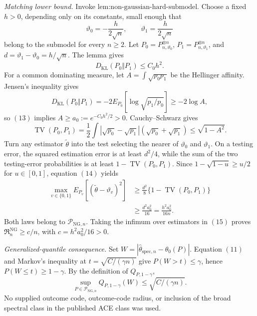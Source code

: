 \emph{Matching lower bound.}
Invoke \(\text{lem:non-gaussian-hard-submodel}\).  Choose a fixed \(h>0\), depending only on its constants, small enough that
\[
 \vartheta_0=-\frac{h}{2\sqrt n},
 \qquad
 \vartheta_1=\frac{h}{2\sqrt n}
\]
belong to the submodel for every \(n\ge2\).  Let \(P_0=P_{n,\vartheta_0}^{\otimes n}\), \(P_1=P_{n,\vartheta_1}^{\otimes n}\), and \(d=\vartheta_1-\vartheta_0=h/\sqrt n\).  The lemma gives
\[
 D_{\mathrm{KL}}(P_0\Vert P_1)\le C_0h^2. \tag{13}
\]
For a common dominating measure, let \(A=\int\sqrt{p_0p_1}\) be the Hellinger affinity.  Jensen's inequality gives
\[
 D_{\mathrm{KL}}(P_0\Vert P_1)
 =-2E_{P_0}\!\left[\log\sqrt{p_1/p_0}\right]
 \ge-2\log A,
\]
so \((13)\) implies \(A\ge a_0:=e^{-C_0h^2/2}>0\).  Cauchy--Schwarz gives
\[
 \operatorname{TV}(P_0,P_1)
 =\frac12\int|\sqrt{p_0}-\sqrt{p_1}|
                  (\sqrt{p_0}+\sqrt{p_1})
 \le\sqrt{1-A^2}. \tag{14}
\]
Turn any estimator \(\widetilde\theta\) into the test selecting the nearer of \(\vartheta_0\) and \(\vartheta_1\).  On a testing error, the squared estimation error is at least \(d^2/4\), while the sum of the two testing-error probabilities is at least \(1-\operatorname{TV}(P_0,P_1)\).  Since \(1-\sqrt{1-u}\ge u/2\) for \(u\in[0,1]\), equation \((14)\) yields
\[
 \begin{aligned}
 \max_{v\in\{0,1\}}
 E_{P_v}[(\widetilde\theta-\vartheta_v)^2]
 &\ge\frac{d^2}{8}\{1-\operatorname{TV}(P_0,P_1)\}\\
 &\ge\frac{d^2a_0^2}{16}
 =\frac{h^2a_0^2}{16n}.
 \end{aligned} \tag{15}
\]
Both laws belong to \(\mathcal P_{\mathrm{NG},n}\).  Taking the infimum over estimators in \((15)\) proves \(\mathfrak R_n^{\mathrm{NG}}\ge c/n\), with \(c=h^2a_0^2/16>0\).

\emph{Generalized-quantile consequence.}
Set \(W=|\widehat\theta_{\mathrm{spec},n}-\theta_0(P)|\).  Equation \((11)\) and Markov's inequality at \(t=\sqrt{C/(\gamma n)}\) give \(P(W>t)\le\gamma\), hence \(P(W\le t)\ge1-\gamma\).  By the definition of \(Q_{P,1-\gamma}\),
\[
 \sup_{P\in\mathcal P_{\mathrm{NG},n}}
 Q_{P,1-\gamma}(W)
 \le\sqrt{C/(\gamma n)}.
\]
No supplied outcome code, outcome-code radius, or inclusion of the broad spectral class in the published ACE class was used.